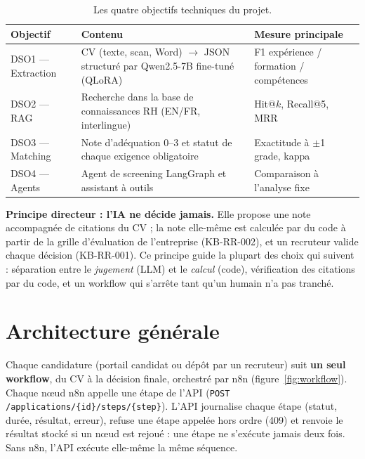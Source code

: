 \documentclass[11pt,a4paper]{report}
\newcommand{\kb}[1]{\textsf{#1}}
\begin{document}
\begin{table}[ht]
\centering\small
\begin{tabularx}{\textwidth}{L{3.1cm}L{6.3cm}Y}
\toprule
\textbf{Objectif} & \textbf{Contenu} & \textbf{Mesure principale}\\
\midrule
DSO1 --- Extraction & CV (texte, scan, Word) $\rightarrow$ JSON structuré par Qwen2.5-7B fine-tuné (QLoRA) & F1 expérience / formation / compétences\\
DSO2 --- RAG & Recherche dans la base de connaissances RH (EN/FR, interlingue) & Hit@$k$, Recall@5, MRR\\
DSO3 --- Matching & Note d'adéquation 0--3 et statut de chaque exigence obligatoire & Exactitude à $\pm$1 grade, kappa\\
DSO4 --- Agents & Agent de screening LangGraph et assistant à outils & Comparaison à l'analyse fixe\\
\bottomrule
\end{tabularx}
\caption{Les quatre objectifs techniques du projet.}
\label{tab:dso}
\end{table}

\textbf{Principe directeur : l'IA ne décide jamais.} Elle propose une note accompagnée de citations du CV ; la note elle-même est calculée par du code à partir de la grille d'évaluation de l'entreprise (\kb{KB-RR-002}), et un recruteur valide chaque décision (\kb{KB-RR-001}). Ce principe guide la plupart des choix qui suivent : séparation entre le \emph{jugement} (LLM) et le \emph{calcul} (code), vérification des citations par du code, et un workflow qui s'arrête tant qu'un humain n'a pas tranché.

\chapter{Architecture générale}

Chaque candidature (portail candidat ou dépôt par un recruteur) suit \textbf{un seul workflow}, du CV à la décision finale, orchestré par n8n (figure~\ref{fig:workflow}). Chaque nœud n8n appelle une étape de l'API (\texttt{POST /applications/\{id\}/steps/\{step\}}). L'API journalise chaque étape (statut, durée, résultat, erreur), refuse une étape appelée hors ordre (409) et renvoie le résultat stocké si un nœud est rejoué : une étape ne s'exécute jamais deux fois. Sans n8n, l'API exécute elle-même la même séquence.
\end{document}
